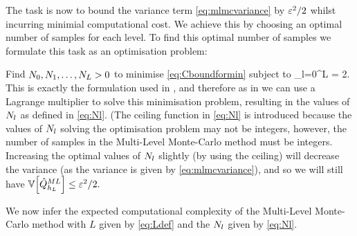 The task is now to bound the variance term \cref{eq:mlmcvariance} by $\varepsilon^2/2$ whilst incurring minimial computational cost. We achieve this by choosing an optimal number of samples for each level. To find this optimal number of samples we formulate this task as an optimisation problem:

Find $N_{0},N_{1},\ldots,N_{L} > 0$ to minimise \cref{eq:Cboundformin} subject to
\beqs
\sum_{l=0}^L \frac{\Vl}{\Nl} = 2.
\eeqs
This is exactly the formulation used in \cite[Section 1.3]{Gi:15}, and therefore as in \cite[Section 1.3]{Gi:15} we can use a Lagrange multiplier to solve this minimisation problem, resulting in the values of $N_{l}$ as defined in \cref{eq:Nl}. (The ceiling function in \cref{eq:Nl} is introduced because the values of $N_{l}$ solving the optimisation problem may not be integers, however, the number of samples in the Multi-Level Monte-Carlo method must be integers. Increasing the optimal values of $N_{l}$ slightly (by using the ceiling) will decrease the variance (as the variance is given by \cref{eq:mlmcvariance}), and so we will still have $\VAR{\QhatMLhL} \leq \eps^2/2.$

We now infer the expected computational complexity of the Multi-Level Monte-Carlo method with $L$ given by \eqref{eq:Ldef} and the $N_{l}$ given by \eqref{eq:Nl}.

